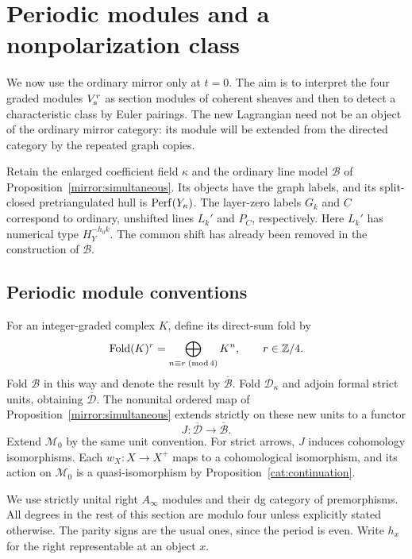 \section{Periodic modules and a nonpolarization class}
\label{per:section}

We now use the ordinary mirror only at $t=0$.  The aim is to interpret
the four graded modules $V_{\rm s}^r$ as section modules of coherent
sheaves and then to detect a characteristic class by Euler pairings.
The new Lagrangian need not be an object of the ordinary mirror
category: its module will be extended from the directed category by
the repeated graph copies.

Retain the enlarged coefficient field $\kappa$ and the ordinary line
model $\mathcal B$ of Proposition~\ref{mirror:simultaneous}.  Its objects
have the graph labels, and its split-closed pretriangulated hull is
$\operatorname{Perf}(Y_\kappa)$.  The layer-zero labels $G_k$ and $C$ correspond to
ordinary, unshifted lines $L_k'$ and $P_C$, respectively.  Here $L_k'$
has numerical type $H_Y^{-h_0k}$.  The common shift has already been
removed in the construction of $\mathcal B$.

\subsection{Periodic module conventions}

For an integer-graded complex $K$, define its direct-sum fold by
\begin{equation}
 \operatorname{Fold}(K)^r
   =\bigoplus_{n\equiv r\;({\rm mod}\,4)}K^n,
 \qquad r\in\mathbb Z/4.
 \label{per:fold}
\end{equation}
Fold $\mathcal B$ in this way and denote the result by
$\overline{\mathcal B}$.  Fold $\mathcal D_\kappa$ and adjoin formal
strict units, obtaining $\overline{\mathcal D}$.  The nonunital ordered
map of Proposition~\ref{mirror:simultaneous} extends strictly on these
new units to a functor
\begin{equation}
 J:\overline{\mathcal D}\longrightarrow\overline{\mathcal B}.
 \label{per:functor}
\end{equation}
Extend $\mathcal M_0$ by the same unit convention.  For strict arrows,
$J$ induces cohomology isomorphisms.  Each $w_X:X\to X^+$ maps to a
cohomological isomorphism, and its action on $\mathcal M_0$ is a
quasi-isomorphism by Proposition~\ref{cat:continuation}.

We use strictly unital right $A_\infty$ modules and their dg category
of premorphisms.  All degrees in the rest of this section are modulo
four unless explicitly stated otherwise.  The parity signs are the
usual ones, since the period is even.  Write $h_x$ for the right
representable at an object $x$.

